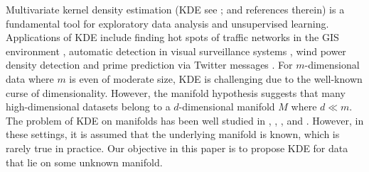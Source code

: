\documentclass[11pt,a4paper,]{article}
\begin{document}
Multivariate kernel density estimation (KDE see \textcite{Parzen1962-gt}; \textcite{Chen2017-dw} and references therein) is a fundamental tool for exploratory data analysis and unsupervised learning. Applications of KDE include finding hot spots of traffic networks in the GIS environment \autocite{Xie2008-eb,Okabe2009-nb}, automatic detection in visual surveillance systems \autocite{Elgammal2002-cw}, wind power density detection \autocite{Jeon2012-ac} and prime prediction via Twitter messages \autocite{Gerber2014-tq}. For \(m\)-dimensional data where \(m\) is even of moderate size, KDE is challenging due to the well-known curse of dimensionality. However, the manifold hypothesis suggests that many high-dimensional datasets belong to a \(d\)-dimensional manifold \(M\) where \(d\ll m\). The problem of KDE on manifolds has been well studied in \textcite{Hendriks1990-bt}, \textcite{Izenman1991-cj}, \textcite{Pelletier2005-vu}, \textcite{Henry2013-da} and \textcite{Berenfeld2022-fd}. However, in these settings, it is assumed that the underlying manifold is known, which is rarely true in practice. Our objective in this paper is to propose KDE for data that lie on some unknown manifold.
\end{document}
